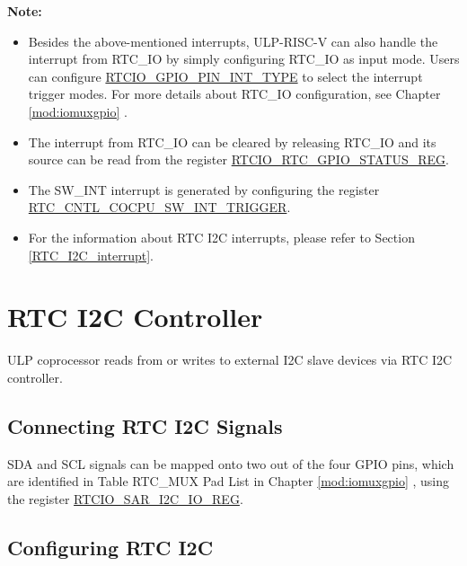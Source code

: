 \documentclass[main\_\_EN.tex]{subfiles}
\begin{document}
\textbf{Note:}
\begin{itemize}
    \item Besides the above-mentioned interrupts, ULP-RISC-V can also handle the interrupt from RTC\_IO by simply configuring RTC\_IO as input mode. Users can configure \hyperref[fielddesc:RTCIOGPIOPINNINTTYPE]{RTCIO\_GPIO\_PIN\_INT\_TYPE} to select the interrupt trigger modes. For more details about RTC\_IO configuration, see Chapter \ref{mod:iomuxgpio} \textit{}.
    \item The interrupt from RTC\_IO can be cleared by releasing RTC\_IO and its source can be read from the register \hyperref[regdesc:RTCIORTCGPIOSTATUSREG]{RTCIO\_RTC\_GPIO\_STATUS\_REG}.
    \item The SW\_INT interrupt is generated by configuring the register \hyperref[fielddesc:RTCCNTLCOCPUSWINTTRIGGER]{RTC\_CNTL\_COCPU\_SW\_INT\_TRIGGER}.
    \item For the information about RTC I2C interrupts, please refer to Section \ref{RTC_I2C_interrupt}.
\end{itemize}

\section{RTC I2C Controller} \label{subsection:RTC_I2C-Controller}

ULP coprocessor reads from or writes to external I2C slave devices via RTC I2C controller.

\subsection{Connecting RTC I2C Signals}

SDA and SCL signals can be mapped onto two out of the four GPIO pins, which are identified in Table RTC\_MUX Pad List in Chapter \ref{mod:iomuxgpio} \textit{}, using the register \hyperref[regdesc:RTCIOSARI2CIOREG]{RTCIO\_SAR\_I2C\_IO\_REG}.

\subsection{Configuring RTC I2C}
\end{document}
